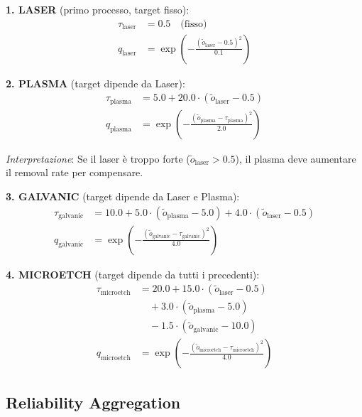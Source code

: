 \documentclass[11pt,a4paper]{article}
\begin{document}
\textbf{1. LASER} (primo processo, target fisso):
\begin{equation}
\begin{aligned}
\tau_{\text{laser}} &= 0.5 \quad \text{(fisso)} \\
q_{\text{laser}} &= \exp\left(-\frac{(\tilde{o}_{\text{laser}} - 0.5)^2}{0.1}\right)
\end{aligned}
\end{equation}

\textbf{2. PLASMA} (target dipende da Laser):
\begin{equation}
\begin{aligned}
\tau_{\text{plasma}} &= 5.0 + 20.0 \cdot (\tilde{o}_{\text{laser}} - 0.5) \\
q_{\text{plasma}} &= \exp\left(-\frac{(\tilde{o}_{\text{plasma}} - \tau_{\text{plasma}})^2}{2.0}\right)
\end{aligned}
\end{equation}

\textit{Interpretazione}: Se il laser è troppo forte ($\tilde{o}_{\text{laser}} > 0.5$), il plasma deve aumentare il removal rate per compensare.

\textbf{3. GALVANIC} (target dipende da Laser e Plasma):
\begin{equation}
\begin{aligned}
\tau_{\text{galvanic}} &= 10.0 + 5.0 \cdot (\tilde{o}_{\text{plasma}} - 5.0) + 4.0 \cdot (\tilde{o}_{\text{laser}} - 0.5) \\
q_{\text{galvanic}} &= \exp\left(-\frac{(\tilde{o}_{\text{galvanic}} - \tau_{\text{galvanic}})^2}{4.0}\right)
\end{aligned}
\end{equation}

\textbf{4. MICROETCH} (target dipende da tutti i precedenti):
\begin{equation}
\begin{aligned}
\tau_{\text{microetch}} &= 20.0 + 15.0 \cdot (\tilde{o}_{\text{laser}} - 0.5) \\
&\quad + 3.0 \cdot (\tilde{o}_{\text{plasma}} - 5.0) \\
&\quad - 1.5 \cdot (\tilde{o}_{\text{galvanic}} - 10.0) \\
q_{\text{microetch}} &= \exp\left(-\frac{(\tilde{o}_{\text{microetch}} - \tau_{\text{microetch}})^2}{4.0}\right)
\end{aligned}
\end{equation}

\subsection{Reliability Aggregation}
\end{document}
